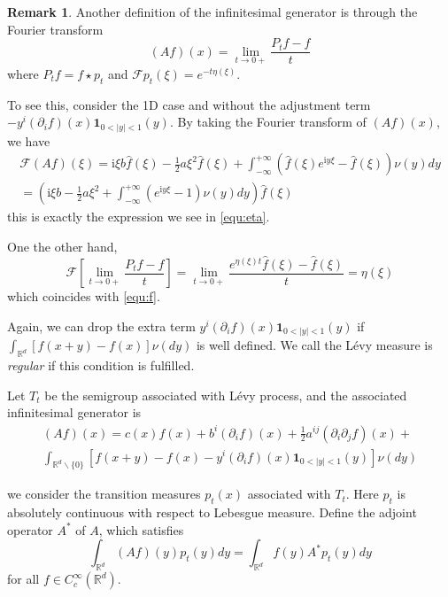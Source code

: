 \documentclass[10pt,a4paper]{article}
\newcommand{\ii}[0]{\mathrm{i}}
\newcommand{\RR}[0]{\mathbb{R}}
\theoremstyle{definition}
\newtheorem{remark}{Remark}
\begin{document}
\begin{remark}
	Another definition of the infinitesimal generator is through the Fourier transform 
	\begin{equation}
		(Af)(x) = \lim_{t\rightarrow 0+} \frac{P_t f-f}{t}
	\end{equation}
	where $P_tf = f\star p_t$ and $\mathcal{F}p_t(\xi) = e^{-t\eta(\xi)}$. 
	
	To see this, consider the 1D case and without the adjustment term $-y^i(\partial_i f)(x) \mathbf{1}_{0<|y|<1}(y)$. By taking the Fourier transform of $(Af)(x)$, we have 
	\begin{multline}\label{equ:f}
		\mathcal{F}(Af)(\xi) = \ii\xi b\hat f(\xi ) - \frac{1}{2}a{\xi ^2}\hat f(\xi ) + \int_{ - \infty }^{ + \infty } {(\hat f(\xi ){e^{\ii y\xi }} - \hat f(\xi ))\nu (y)dy} \\
		=\left( {\ii\xi b - \frac{1}{2}a{\xi ^2} + \int_{ - \infty }^{ + \infty } {({e^{\ii y\xi }} - 1)\nu (y)dy} } \right)\hat f(\xi )
	\end{multline}
	this is exactly the expression we see in \cref{equ:eta}. 
	
	One the other hand, 
	\[\mathcal{F}\left[\mathop {\lim }\limits_{t \to 0 + } \frac{{{P_t}f - f}}{t}\right] = \mathop {\lim }\limits_{t \to 0 + } \frac{{{e^{\eta (\xi )t}}\hat f(\xi ) - \hat f(\xi )}}{t} = \eta (\xi )\]
	which coincides with \cref{equ:f}. 
	
\end{remark}

Again, we can drop the extra term $y^i(\partial_i f)(x) \mathbf{1}_{0<|y|<1}(y)$ if $\int_{\RR^d} [f(x+y)-f(x)]\nu(dy)$ is well defined. We call the L\'evy measure is \textit{regular} if this condition is fulfilled.


Let $T_t$ be the semigroup associated with L\'evy process, and the associated infinitesimal generator is
\begin{multline}\label{equ:Af2}
	(Af)(x) =  c(x) f(x) + b^i(\partial_i f)(x) + \frac{1}{2}a^{ij}(\partial_i \partial_j f)(x) +\\
	\int_{\RR^d\backslash\{0\}} [f(x+y)-f(x)-y^i(\partial_i f)(x) \mathbf{1}_{0<|y|<1}(y)]\nu(dy)
\end{multline}

 we consider the transition measures $p_t(x)$ associated with $T_t$. Here $p_t$ is absolutely continuous with respect to Lebesgue measure. Define the adjoint operator $A^*$ of $A$, which satisfies
 \begin{equation}
 	\int_{\RR^d} (Af)(y) p_t(y)dy=\int_{\RR^d} f(y)A^*p_t(y)dy
 \end{equation}
 for all $f\in C_c^\infty(\RR^d)$.
 
\end{document}
